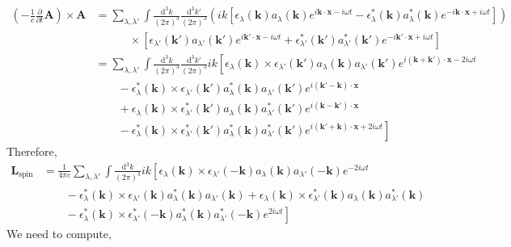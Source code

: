 \documentclass[12pt]{extarticle}
\newcommand{\dn}[2]{\: \mathrm{d}^{#1} #2 \:}
\newcommand{\pderiv}[2]{\frac{\partial{#1}}{\partial{#2}}}
\renewcommand{\bf}[1]{\mathbf{#1}}
\theoremstyle{definition}
\begin{document}
\begin{align*}
\left( -\frac{1}{c} \pderiv{}{t} \bf{A} \right) \times \bf{A} & = \sum_{\lambda, \lambda'} \int \frac{\dn{3}{k}}{(2 \pi)^3} \frac{\dn{3}{k'}}{(2 \pi)^3} \left( i k \left[\epsilon_{\lambda}(\bf{k}) a_\lambda (\bf{k}) e^{i \bf{k} \cdot \bf{x} - i \omega t} - \epsilon_\lambda^*(\bf{k}) a_\lambda^*(\bf{k}) e^{- i \bf{k} \cdot \bf{x} + i \omega t} \right] \right)
\\
& \quad \quad \quad \times \left[ \epsilon_{\lambda'}(\bf{k}') a_{\lambda'} (\bf{k}') e^{i \bf{k}' \cdot \bf{x} - i \omega t} + \epsilon_{\lambda'}^*(\bf{k}') a_{\lambda'}^*(\bf{k}') e^{- i \bf{k}' \cdot \bf{x} + i \omega t} \right]
\\
& = \sum_{\lambda, \lambda'} \int \frac{\dn{3}{k}}{(2 \pi)^3} \frac{\dn{3}{k'}}{(2 \pi)^3} ik \left[ \epsilon_{\lambda}(\bf{k}) \times \epsilon_{\lambda'}(\bf{k}') a_{\lambda}(\bf{k}) a_{\lambda'}(\bf{k}') e^{i (\bf{k} + \bf{k}') \cdot \bf{x} - 2 i \omega t} 
\right.
\\
& \left. \quad \quad - \epsilon^*_{\lambda}(\bf{k}) \times \epsilon_{\lambda'}(\bf{k}') a_\lambda^*(\bf{k}) a_{\lambda'}(\bf{k}') e^{i (\bf{k}' - \bf{k}) \cdot \bf{x}} 
\right. 
\\
& \left. \quad \quad + \epsilon_{\lambda}(\bf{k}) \times \epsilon^*_{\lambda'}(\bf{k}') a_\lambda(\bf{k}) a_{\lambda'}^*(\bf{k}') e^{i (\bf{k} - \bf{k}') \cdot \bf{x}}
\right. 
\\
& \left. \quad \quad - \epsilon^*_{\lambda}(\bf{k}) \times \epsilon^*_{\lambda'}(\bf{k}') a_\lambda^*(\bf{k}) a_{\lambda'}^*(\bf{k}') e^{i (\bf{k}' + \bf{k}) \cdot \bf{x} + 2 i \omega t} \right]
\end{align*}
Therefore,
\begin{align*}
\bf{L}_{\text{spin}} & = \frac{1}{4 \pi c} \sum_{\lambda, \lambda'} \int \frac{\dn{3}{k}}{(2 \pi)^3} ik \left[ \epsilon_{\lambda}(\bf{k}) \times \epsilon_{\lambda'}(-\bf{k}) a_{\lambda}(\bf{k}) a_{\lambda'}(-\bf{k}) e^{- 2 i \omega t} 
\right.
\\
& \left. \quad \quad - \epsilon^*_{\lambda}(\bf{k}) \times \epsilon_{\lambda'}(\bf{k}) a_\lambda^*(\bf{k}) a_{\lambda'}(\bf{k})
+ \epsilon_{\lambda}(\bf{k}) \times \epsilon^*_{\lambda'}(\bf{k}) a_\lambda(\bf{k}) a_{\lambda'}^*(\bf{k}) 
\right. 
\\
& \left. \quad \quad - \epsilon^*_{\lambda}(\bf{k}) \times \epsilon^*_{\lambda'}(-\bf{k}) a_\lambda^*(\bf{k}) a_{\lambda'}^*(-\bf{k}) e^{ 2 i \omega t} \right]  
\end{align*}
We need to compute,
\end{document}
